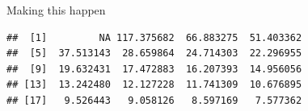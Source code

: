 \begin{frame}[fragile]{Making this happen}
  
\begin{knitrout}
\color{fgcolor}\begin{kframe}
\begin{alltt}
\hlkwb{=}\hlopt{:}
\hlkwb{=}\hlstd{(}\hlstd{)}
   
\hlstd{\{}
  \hlkwb{=}\hlstd{(vital.s[}\hlopt{:}\hlstd{],i,}\hlstd{=}\hlstd{)}\hlopt{$}
\hlstd{\}}
\end{alltt}
\begin{verbatim}
##  [1]         NA 117.375682  66.883275  51.403362
##  [5]  37.513143  28.659864  24.714303  22.296955
##  [9]  19.632431  17.472883  16.207393  14.956056
## [13]  13.242480  12.127228  11.741309  10.676895
## [17]   9.526443   9.058126   8.597169   7.577362
\end{verbatim}
\end{kframe}
\end{knitrout}
  
\end{frame}

